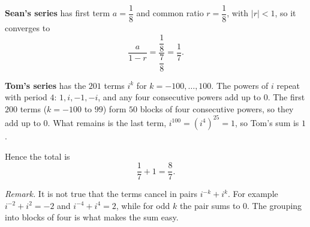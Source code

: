 \textbf{Sean's series} has first term $a=\dfrac{1}{8}$ and common ratio $r=\dfrac{1}{8}$, with $|r|<1$, so it converges to
\[
\dfrac{a}{1-r}=\dfrac{\dfrac{1}{8}}{\dfrac{7}{8}}=\dfrac{1}{7} .
\]

\textbf{Tom's series} has the $201$ terms $i^k$ for $k=-100,\dots,100$. The powers of $i$ repeat with period $4$: $1,i,-1,-i$, and any four consecutive powers add up to $0$. The first $200$ terms ($k=-100$ to $99$) form $50$ blocks of four consecutive powers, so they add up to $0$. What remains is the last term, $i^{100}=\left(i^4\right)^{25}=1$, so Tom's sum is $1$.

Hence the total is
\[
\dfrac{1}{7}+1=\boxed{\dfrac{8}{7}}.
\]

\emph{Remark.} It is not true that the terms cancel in pairs $i^{-k}+i^{k}$. For example $i^{-2}+i^{2}=-2$ and $i^{-4}+i^4=2$, while for odd $k$ the pair sums to $0$. The grouping into blocks of four is what makes the sum easy.
